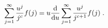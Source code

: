 \begin{equation}
\sum_{j=1}^\infty  \frac{u^j}{j^c} f(j) =
u \frac{{\rm d}}{{\rm d}u} \sum_{j=1}^\infty \frac{u^j}{j^{c+1}} f(j) \;. 
\label{derivative}
\end{equation}

